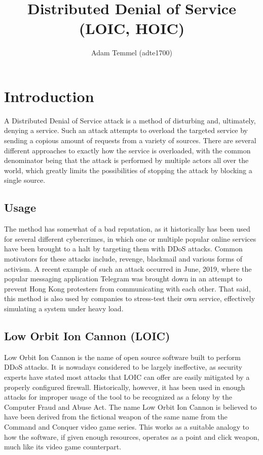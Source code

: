 \documentclass[a4paper, titlepage,12pt]{article}
\title{Distributed Denial of Service (LOIC, HOIC)}
\author{Adam Temmel (adte1700)}
\begin{document}
	\maketitle
	\section{Introduction}\label{sec:introduction}
		A Distributed Denial of Service attack is a method of disturbing and, ultimately, denying a service. Such an attack attempts to overload the targeted service by sending a copious amount of requests from a variety of sources. There are several different approaches to exactly how the service is overloaded, with the common denominator being that the attack is performed by multiple actors all over the world, which greatly limits the possibilities of stopping the attack by blocking a single source. 
	\subsection{Usage}\label{sec:usage}
		The method has somewhat of a bad reputation, as it historically has been used for several different cybercrimes, in which one or multiple popular online services have been brought to a halt by targeting them with DDoS attacks. Common motivators for these attacks include, revenge, blackmail and various forms of activism. A recent example of such an attack occurred in June, 2019, where the popular messaging application Telegram was brought down in an attempt to prevent Hong Kong protesters  from communicating with each other. That said, this method is also used by companies to stress-test their own service, effectively simulating a system under heavy load.
	\subsection{Low Orbit Ion Cannon (LOIC)}
		Low Orbit Ion Cannon is the name of open source software built to perform DDoS attacks. It is nowadays considered to be largely ineffective, as security experts have stated most attacks that LOIC can offer are easily mitigated by a properly configured firewall. Historically, however, it has been used in enough attacks for improper usage of the tool to be recognized as a felony by the Computer Fraud and Abuse Act. The name Low Orbit Ion Cannon is believed to have been derived from the fictional weapon of the same name from the Command and Conquer video game series. This works as a suitable analogy to how the software, if given enough resources, operates as a point and click weapon, much like its video game counterpart.
\end{document}

